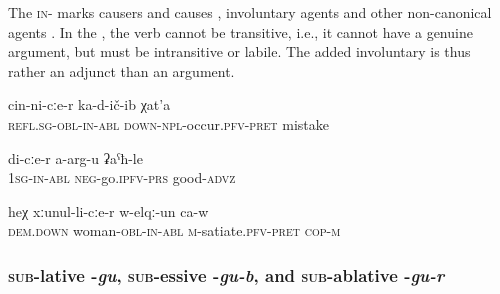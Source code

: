 The \textsc{in}- marks causers and causes , involuntary agents  and other non-canonical agents . In the , the verb cannot be transitive, i.e., it cannot have a genuine  argument, but must be intransitive or labile. The added involuntary  is thus rather an adjunct than an argument.
%
\begin{exe}
	\ex	\label{the mistakes that he made that happened through him}
	\gll	cin-ni-cːe-r	ka-d-ič-ib	χat'a \\
		\textsc{refl}.\textsc{sg}-\textsc{obl-in}-\textsc{abl}	\textsc{down}-\textsc{npl}-occur.\textsc{pfv}-\textsc{pret} mistake\\
	\glt	{}
	
	\ex	\label{I cannot do it well (lit. it will not go well from me}
	\gll	di-cːe-r	a-arg-u	ʡaˁħ-le \\
		1\textsc{sg-in}-\textsc{abl}	\textsc{neg}-go.\textsc{ipfv}-\textsc{prs}	good-\textsc{advz}\\
	\glt	{}
	
	\ex	\label{He had enough of his wife}
	\gll	heχ	xːunul-li-cːe-r	w-elqː-un ca-w \\
		\textsc{dem.down}	woman-\textsc{obl-in}-\textsc{abl}	\textsc{m}-satiate.\textsc{pfv}-\textsc{pret} \textsc{cop-m}\\
	\glt	{}
\end{exe}



\subsubsection{\textsc{sub}-lative -\textit{gu}, \textsc{sub}-essive -\textit{gu-b}, and \textsc{sub}-ablative -\textit{gu-r}}
\label{sssec:sub-lative -gu, sub-essive -gu-b, and sub-\isi{ablative} -gu-r}

